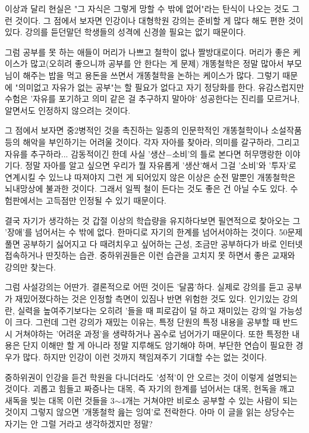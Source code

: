 이상과 달리 현실은 "그 자식은 그렇게 망할 수 밖에 없어"라는 탄식이 나오는 것도 그런 것이다.
그 점에서 보자면 인강이나 대형학원 강의는 준비할 게 많다 해도 편한 것이 있다. 강의를 듣던말던 학생들의 성격에 신경쓸 필요는 없기 때문이다.
\vspace{5mm}

그럼 공부를 못 하는 애들이 머리가 나쁘고 철학이 없나
짤방대로이다. 머리가 좋은 케이스가 많고(오히려 좋으니까 공부를 안 한다는 게 문제)
개똥철학은 정말 많아서 부모님이 해주는 밥을 먹고 용돈을 쓰면서 개똥철학을 논하는 케이스가 많다.
그렇기 때문에 "의미없고 자유가 없는 공부"는 할 필요가 없다고 자기 정당화를 한다.
유감스럽지만 수험은 '자유를 포기하고 의미 같은 걸 추구하지 말아야' 성공한다는 진리를 모르거나, 알면서도 인정하지 않으려는 것이다.
\vspace{5mm}

그 점에서 보자면 중2병적인 것을 촉진하는 일종의 인문학적인 개똥철학이나 소설작품 등의 해악을 부인하기는 어려울 것이다.
각자 자아를 찾아라, 의미를 갈구하라, 그리고 자유를 추구하라... 감동적이긴 한데 사실 '생산$-$소비'의 틀로 본다면 허무맹랑한 이야기다.
정말 자아를 알고 싶으면 우리가 뭘 자유롭게 '생산'해서 그걸 '소비'와 '투자'로 연계시킬 수 있느냐 따져야지
그런 게 되어있지 않은 이상은 순전 말뿐인 개똥철학은 뇌내망상에 불과한 것이다.
그래서 일찍 철이 든다는 것도 좋은 건 아닐 수도 있다. 수험판에서는 고득점만 인정될 수 있기 때문이다.
\vspace{5mm}

결국 자기가 생각하는 것 갑절 이상의 학습량을 유지하다보면 필연적으로 찾아오는 그 '장애'를 넘어서는 수 밖에 없다.
한마디로 자기의 한계를 넘어서야하는 것이다.
50문제 풀면 공부하기 싫어지고 다 때려치우고 싶어하는 근성, 조금만 공부하다가 바로 인터넷 접속하거나 딴짓하는 습관.
중하위권들은 이런 습관을 고치지 못 하면서 좋은 교재와 강의만 찾는다.
\vspace{5mm}

그럼 사설강의는 어딴가. 결론적으로 어떤 것이든 '달콤'하다.
실제로 강의를 듣고 공부가 재밌어졌다하는 것은 인정할 측면이 있짐나 반면 위험한 것도 있다.
인기있는 강의란, 실력을 높여주기보다는 오히려 '들을 때 피로감이 덜 하고 재미있는 강의'일 가능성이 크다.
그런데 그런 강의가 재밌는 이유는, 특정 단원의 특정 내용을 공부할 때 반드시 거쳐야하는 '어려운 과정'을 생략하거나 꼼수로 넘어가기 때문이다.
또한 특정한 내용은 단지 이해만 할 게 아니라 정말 지루해도 암기해야 하며, 부단한 연습이 필요한 경우가 많다.
하지만 인강이 이런 것까지 책임져주기 기대할 수는 없는 것이다.
\vspace{5mm}

중하위권이 인강을 듣건 학원을 다니더라도 '성적'이 안 오르는 것이 이렇게 설명되는 것이다.
괴롭고 힘들고 짜증나는 대목, 즉 자기의 한계를 넘어서는 대목, 헌독을 깨고 새독을 빚는 대목
이런 것들을 3$\sim$4개는 거쳐야만 비로소 공부할 수 있는 사람이 되는 것이지 그렇지 않으면 '개똥철학 읊는 잉여'로 전락한다.
아마 이 글을 읽는 상당수는 자기는 안 그럴 거라고 생각하겠지만 정말?
\vspace{5mm}

